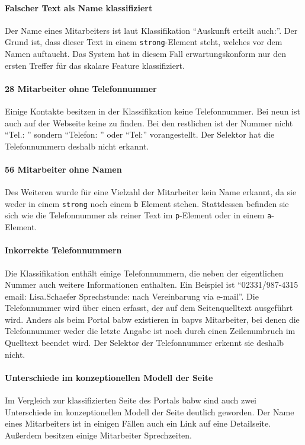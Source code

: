     \paragraph{Falscher Text als Name klassifiziert}
    Der Name eines Mitarbeiters ist laut Klassifikation
    "`Auskunft erteilt auch:"'.
    Der Grund ist, dass dieser Text in einem \texttt{strong}-Element steht,
    welches vor dem Namen auftaucht.
    Das System hat in diesem Fall erwartungskonform nur den ersten
    Treffer für das skalare Feature klassifiziert.
        
    \paragraph{28 Mitarbeiter ohne Telefonnummer}
    Einige Kontakte besitzen in der Klassifikation keine Telefonnummer.
    Bei neun ist auch auf der Webseite keine zu finden.
    Bei den restlichen ist der Nummer nicht "`Tel.: "'
    sondern "`Telefon: "' oder "`Tel:"' vorangestellt.
    Der Selektor hat die Telefonnummern deshalb nicht erkannt.
    
    \paragraph{56 Mitarbeiter ohne Namen}
    Des Weiteren wurde für eine Vielzahl der Mitarbeiter kein Name erkannt,
    da sie weder in einem \texttt{strong} noch einem \texttt{b} Element stehen.
    Stattdessen befinden sie sich wie die Telefonnummer als reiner Text im \texttt{p}-Element
    oder in einem \texttt{a}-Element.

    \paragraph{Inkorrekte Telefonnummern}
    Die Klassifikation enthält einige Telefonnummern,
    die neben der eigentlichen Nummer auch weitere Informationen enthalten.
    Ein Beispiel ist "`02331/987-4315 email: Lisa.Schaefer Sprechstunde: nach Vereinbarung via e-mail"'.
    Die Telefonnummer wird über einen {\xpathSelector} erfasst,
    der auf dem Seitenquelltext ausgeführt wird.
    Anders als beim Portal \gls{babw} existieren in \gls{bapvs} Mitarbeiter,
    bei denen die Telefonnummer weder die letzte Angabe ist
    noch durch einen Zeilenumbruch im Quelltext beendet wird.
    Der Selektor der Telefonnummer erkennt sie deshalb
    nicht.

    \paragraph{Unterschiede im konzeptionellen Modell der Seite}
    Im Vergleich zur klassifizierten Seite des Portals \gls{babw}
    sind auch zwei Unterschiede im konzeptionellen Modell der Seite deutlich geworden.
    Der Name eines Mitarbeiters ist in einigen Fällen
    auch ein Link auf eine Detailseite.
    Außerdem besitzen einige Mitarbeiter Sprechzeiten.

